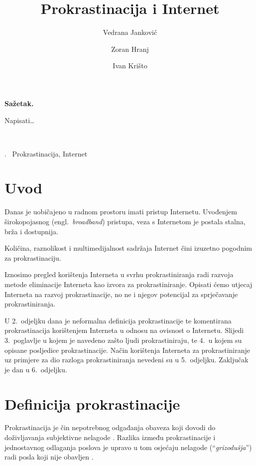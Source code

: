 \documentclass[11pt,twocolumn,english]{article}
\let\LaTeXtitle\title
\renewcommand{\title}[1]{\LaTeXtitle{\Large \textbf{#1}}}
\renewenvironment{abstract}
{\noindent \large \bf Sažetak.\normalsize\begin{it}}
{\end{it}\\}
\newenvironment{keywords}
{\noindent {\large {\bf Ključne riječi}}.~}{}
\newcommand{\engl}[1]{(engl.~\emph{#1})}
\begin{document}
\title{Prokrastinacija i Internet}
\author{Vedrana Janković}
\author{Zoran Hranj}
\author{Ivan Krišto}

\date{}

\maketitle
\thispagestyle{empty}
\pagestyle{empty}

\begin{abstract}
Napisati\ldots
\end{abstract}

\begin{keywords}
Prokrastinacija, Internet
\end{keywords}

\section{Uvod}
Danas je uobičajeno u radnom prostoru imati pristup Internetu. Uvođenjem
širokopojasnog \engl{broadband} pristupa, veza s Internetom je postala stalna,
brža i dostupnija.

Količina, raznolikost i multimedijalnost sadržaja Internet čini izuzetno
pogodnim za prokrastinaciju.

Iznosimo pregled korištenja Interneta u svrhu prokrastiniranja radi razvoja
metode eliminacije Interneta kao izvora za prokrastiniranje. Opisati ćemo
utjecaj Interneta na razvoj prokrastinacije, no ne i njegov potencijal za
sprječavanje prokrastiniranja.

U 2.~odjeljku dana je neformalna definicija prokrastinacije te komentirana
prokrastinacija korištenjem Interneta u odnosu na ovisnost o Internetu. Slijedi
3.~poglavlje u kojem je navedeno zašto ljudi prokrastiniraju, te 4.~u kojem su
opisane posljedice prokrastinacije. Način korištenja Interneta za
prokrastiniranje uz primjere za dio razloga prokrastiniranja nevedeni su u
5.~odjeljku. Zaključak je dan u 6.~odjeljku.


\section{Definicija prokrastinacije}
Prokrastinacija je čin nepotrebnog odgađanja obaveza koji dovodi do 
doživljavanja subjektivne nelagode \cite{solomon1984academic}. Razlika između
prokrastinacije i jednostavnog odlaganja poslova je upravo u tom osjećaju
nelagode (``\emph{grizodušja}'') radi posla koji nije obavljen
\cite{burka2004procrastination}.
\end{document}
